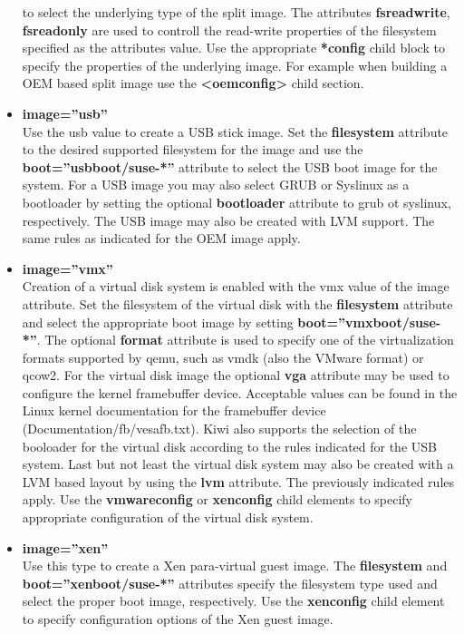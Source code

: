 \begin{itemize}
      to select the underlying type of the split image. The attributes
      \textbf{fsreadwrite}, \textbf{fsreadonly} are used to controll the
      read-write properties of the filesystem specified as the attributes
      value. Use the appropriate \textbf{*config} child block to specify
      the properties of the underlying image. For example when building a 
      OEM based split image use the \textbf{<oemconfig>} child section.
\item \textbf{image=''usb''}\\
      Use the usb value to create a USB stick image. Set the
      \textbf{filesystem} attribute to the desired supported filesystem for
      the image and use the \textbf{boot=''usbboot/suse-*''} attribute to
      select the USB boot image for the system. For a USB image you may
      also select GRUB or Syslinux as a bootloader by setting the
      optional \textbf{bootloader} attribute to grub ot syslinux,
      respectively. The USB image may also be created with LVM support.
      The same rules as indicated for the OEM image apply.
\item \textbf{image=''vmx''}\\
      Creation of a virtual disk system is enabled with the vmx value of
      the image attribute. Set the filesystem of the virtual disk with
      the \textbf{filesystem} attribute and select the appropriate boot
      image by setting \textbf{boot=''vmxboot/suse-*''}. The optional
      \textbf{format} attribute is used to specify one of the virtualization
      formats supported by qemu, such as vmdk (also the VMware format) or
      qcow2. For the virtual disk image the optional \textbf{vga} attribute
      may be used to configure the kernel framebuffer device. Acceptable
      values can be found in the Linux kernel documentation for the
      framebuffer device (Documentation/fb/vesafb.txt). Kiwi also supports
      the selection of the booloader for the virtual disk according to
      the rules indicated for the USB system. Last but not least
      the virtual disk system may also be created with a LVM based layout by
      using the \textbf{lvm} attribute. The previously indicated rules apply.
      Use the \textbf{vmwareconfig} or \textbf{xenconfig} child elements
      to specify appropriate configuration of the virtual disk system.
\item \textbf{image=''xen''}\\
      Use this type to create a Xen para-virtual guest image. The
      \textbf{filesystem} and \textbf{boot=''xenboot/suse-*''} attributes
      specify the filesystem type used and select the proper boot image,
      respectively. Use the \textbf{xenconfig} child element to specify
      configuration options of the Xen guest image.
\end{itemize}

